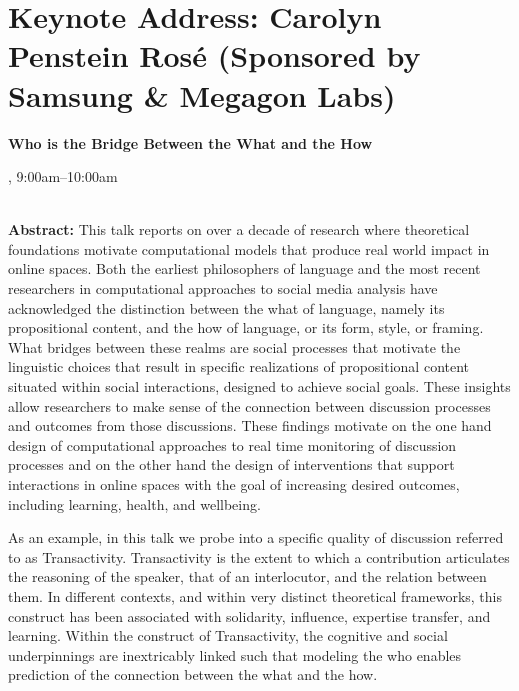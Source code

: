 \section{Keynote Address: Carolyn Penstein Rosé (Sponsored by Samsung \& Megagon Labs)}

\begin{center}
\begin{Large}
{\bfseries\Large Who is the Bridge Between the What and the How}
\vspace{1em}\par
\end{Large}

\daydateyear, 9:00am--10:00am \vspace{1em}\\
\PlenaryLoc \\
\vspace{1em}\par
\end{center}

\noindent

{\bf Abstract:} This talk reports on over a decade of research where theoretical foundations motivate computational models that produce real world impact in online spaces. Both the earliest philosophers of language and the most recent researchers in computational approaches to social media analysis have acknowledged the distinction between the what of language, namely its propositional content, and the how of language, or its form, style, or framing. What bridges between these realms are social processes that motivate the linguistic choices that result in specific realizations of propositional content situated within social interactions, designed to achieve social goals. These insights allow researchers to make sense of the connection between discussion processes and outcomes from those discussions. These findings motivate on the one hand design of computational approaches to real time monitoring of discussion processes and on the other hand the design of interventions that support interactions in online spaces with the goal of increasing desired outcomes, including learning, health, and wellbeing.

As an example, in this talk we probe into a specific quality of discussion referred to as Transactivity. Transactivity is the extent to which a contribution articulates the reasoning of the speaker, that of an interlocutor, and the relation between them. In different contexts, and within very distinct theoretical frameworks, this construct has been associated with solidarity, influence, expertise transfer, and learning. Within the construct of Transactivity, the cognitive and social underpinnings are inextricably linked such that modeling the who enables prediction of the connection between the what and the how.

